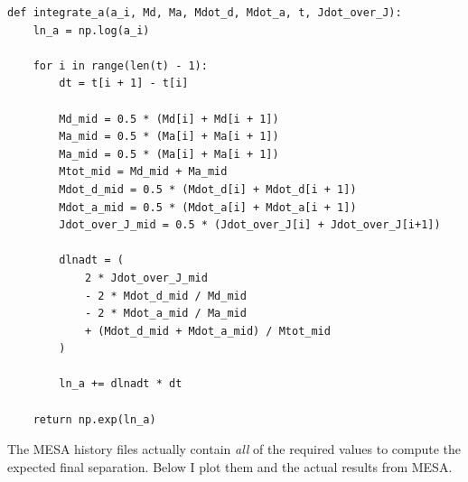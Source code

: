 \documentclass[a4paper,10pt]{article}
\begin{document}
\begin{verbatim}
def integrate_a(a_i, Md, Ma, Mdot_d, Mdot_a, t, Jdot_over_J):
    ln_a = np.log(a_i)

    for i in range(len(t) - 1):
        dt = t[i + 1] - t[i]

        Md_mid = 0.5 * (Md[i] + Md[i + 1])
        Ma_mid = 0.5 * (Ma[i] + Ma[i + 1])
        Ma_mid = 0.5 * (Ma[i] + Ma[i + 1])
        Mtot_mid = Md_mid + Ma_mid
        Mdot_d_mid = 0.5 * (Mdot_d[i] + Mdot_d[i + 1])
        Mdot_a_mid = 0.5 * (Mdot_a[i] + Mdot_a[i + 1])
        Jdot_over_J_mid = 0.5 * (Jdot_over_J[i] + Jdot_over_J[i+1])

        dlnadt = (
            2 * Jdot_over_J_mid 
            - 2 * Mdot_d_mid / Md_mid
            - 2 * Mdot_a_mid / Ma_mid
            + (Mdot_d_mid + Mdot_a_mid) / Mtot_mid
        )

        ln_a += dlnadt * dt

    return np.exp(ln_a)
\end{verbatim}
The MESA history files actually contain \emph{all} of the required values to compute the expected final separation. Below I plot them and the actual results from MESA.

\begin{figure}[ht]
    \centering
\end{figure}





\end{document}
